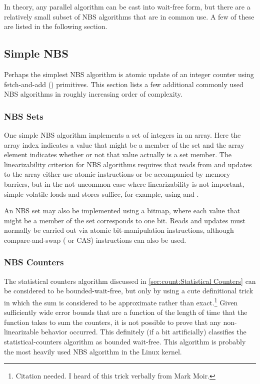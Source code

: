 In theory, any parallel algorithm can be cast into wait-free form,
but there are a relatively small subset of NBS algorithms that are
in common use.
A few of these are listed in the following section.

\subsection{Simple NBS}
\label{sec:advsync:Simple NBS}

Perhaps the simplest NBS algorithm is atomic update of an integer
counter using fetch-and-add () primitives.
This section lists a few additional commonly used NBS algorithms in
roughly increasing order of complexity.

\subsubsection{NBS Sets}
\label{sec:advsync:NBS Sets}

One simple NBS algorithm implements a set of integers in an array.
Here the array index indicates a value that might be a member of the set
and the array element indicates whether or not that value actually is
a set member.
The linearizability criterion for NBS algorithms requires that reads from
and updates to the array either use atomic instructions or be accompanied
by memory barriers, but in the not-uncommon case where linearizability
is not important, simple volatile loads and stores suffice, for example,
using  and .

An NBS set may also be implemented using a bitmap, where each value that
might be a member of the set corresponds to one bit.
Reads and updates must normally be carried out via atomic bit-manipulation
instructions, although compare-and-swap ( or CAS)
instructions can also be used.

\subsubsection{NBS Counters}
\label{sec:advsync:NBS Counters}

The statistical counters algorithm discussed in
\cref{sec:count:Statistical Counters}
can be considered to be bounded-wait-free, but only by using a cute
definitional trick in which the sum is considered to be approximate
rather than exact.\footnote{
	Citation needed.
	I heard of this trick verbally from Mark Moir.}
Given sufficiently wide error bounds that are a function of the length
of time that the  function takes to sum the counters,
it is not possible to prove that any non-linearizable behavior occurred.
This definitely (if a bit artificially) classifies the statistical-counters
algorithm as bounded wait-free.
This algorithm is probably the most heavily used NBS algorithm in the
Linux kernel.


